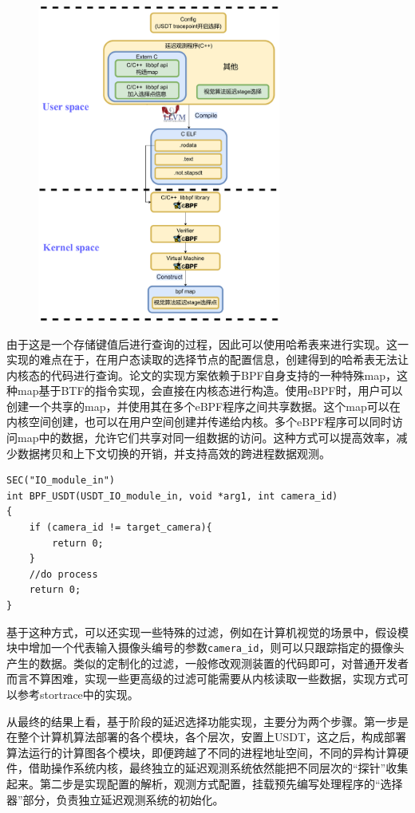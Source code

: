 \documentclass[master]{shtthesis}
\begin{document}
\begin{figure}[htbp]
	\centering
	\includegraphics[width=8cm]{img/maps.pdf}
	\label{使用BPF-map实现采样点选择}
\end{figure}
由于这是一个存储键值后进行查询的过程，因此可以使用哈希表来进行实现。这一实现的难点在于，在用户态读取的选择节点的配置信息，创建得到的哈希表无法让内核态的代码进行查询。论文的实现方案依赖于BPF自身支持的一种特殊map，这种map基于BTF的指令实现，会直接在内核态进行构造。使用eBPF时，用户可以创建一个共享的map，并使用其在多个eBPF程序之间共享数据。这个map可以在内核空间创建，也可以在用户空间创建并传递给内核。多个eBPF程序可以同时访问map中的数据，允许它们共享对同一组数据的访问。这种方式可以提高效率，减少数据拷贝和上下文切换的开销，并支持高效的跨进程数据观测。

\begin{lstlisting}[caption={一种在BPF代码中的实现过滤的方法},captionpos=b]
SEC("IO_module_in")
int BPF_USDT(USDT_IO_module_in, void *arg1, int camera_id)
{
	if (camera_id != target_camera){
		return 0;
	}
	//do process
	return 0;
}
\end{lstlisting}

基于这种方式，可以还实现一些特殊的过滤，例如在计算机视觉的场景中，假设模块中增加一个代表输入摄像头编号的参数\verb*|camera_id|，则可以只跟踪指定的摄像头产生的数据。类似的定制化的过滤，一般修改观测装置的代码即可，对普通开发者而言不算困难，实现一些更高级的过滤可能需要从内核读取一些数据，实现方式可以参考stortrace\cite{stortrace}中的实现。


从最终的结果上看，基于阶段的延迟选择功能实现，主要分为两个步骤。第一步是在整个计算机算法部署的各个模块，各个层次，安置上USDT，这之后，构成部署算法运行的计算图各个模块，即便跨越了不同的进程地址空间，不同的异构计算硬件，借助操作系统内核，最终独立的延迟观测系统依然能把不同层次的“探针”收集起来。第二步是实现配置的解析，观测方式配置，挂载预先编写处理程序的“选择器”部分，负责独立延迟观测系统的初始化。
\end{document}
